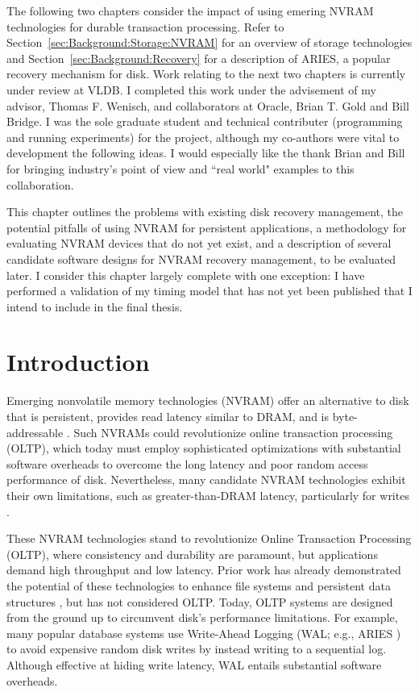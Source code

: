 The following two chapters consider the impact of using emering NVRAM technologies for durable transaction processing.
Refer to Section~\ref{sec:Background:Storage:NVRAM} for an overview of storage technologies and Section~\ref{sec:Background:Recovery} for a description of ARIES, a popular recovery mechanism for disk.
Work relating to the next two chapters is currently under review at VLDB.
I completed this work under the advisement of my advisor, Thomas F. Wenisch, and collaborators at Oracle, Brian T. Gold and Bill Bridge.
I was the sole graduate student and technical contributer (programming and running experiments) for the project, although my co-authors were vital to development the following ideas.
I would especially like the thank Brian and Bill for bringing industry's point of view and ``real world" examples to this collaboration.

This chapter outlines the problems with existing disk recovery management, the potential pitfalls of using NVRAM for persistent applications, a methodology for evaluating NVRAM devices that do not yet exist, and a description of several candidate software designs for NVRAM recovery management, to be evaluated later.
I consider this chapter largely complete with one exception: I have performed a validation of my timing model that has not yet been published that I intend to include in the final thesis. 

\section{Introduction}
\label{sec:OLTP_design:Intro}

Emerging nonvolatile memory technologies (NVRAM) offer an alternative to disk that is persistent, provides read latency similar to DRAM, and is byte-addressable \cite{BurrKurdi08}.
Such NVRAMs could revolutionize online transaction processing (OLTP), which today must employ sophisticated optimizations with substantial software overheads to overcome the long latency and poor random access performance of disk.
Nevertheless, many candidate NVRAM technologies exhibit their own limitations, such as greater-than-DRAM latency, particularly for writes \cite{LeeIpek09}.

These NVRAM technologies stand to revolutionize Online Transaction Processing (OLTP), where consistency and durability are paramount, but applications demand high throughput and low latency.
Prior work has already demonstrated the potential of these technologies to enhance file systems \cite{GreenanMiller06, ConditNightingale09} and persistent data structures \cite{VenkataramanTolia11}, but has not considered OLTP. 
Today, OLTP systems are designed from the ground up to circumvent disk's performance limitations.
For example, many popular database systems use Write-Ahead Logging (WAL; e.g., ARIES \cite{MohanHaderle92}) to avoid expensive random disk writes by instead writing to a sequential log.  
Although effective at hiding write latency, WAL entails substantial software overheads.

